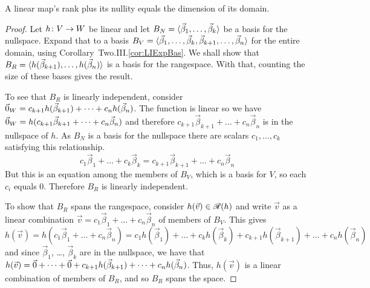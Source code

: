 \begin{theorem}
\label{th:RankPlusNullEqDim}
A linear map's rank plus its nullity equals the dimension of its domain.
\end{theorem}

\begin{proof}
Let \( \mbox{$h\colon V\to W$} \) be linear and
let \( B_N=\langle\vec{\beta}_1,\ldots,\vec{\beta}_k\rangle \)
be a basis for the nullspace.
Expand that to a basis
\( B_V=\langle\vec{\beta}_1,\dots,\vec{\beta}_k,
       \vec{\beta}_{k+1},\dots,\vec{\beta}_n\rangle \)
for the entire domain, using Corollary~Two.III.\ref{cor:LIExpBas}.
We shall show that
\( B_R=\langle h(\vec{\beta}_{k+1}),\dots,h(\vec{\beta}_n)\rangle \)
is a basis for the rangespace.
With that, counting the size of these bases gives the result.

To see that \( B_R \) is linearly independent, 
consider 
\( \vec{0}_W=c_{k+1}h(\vec{\beta}_{k+1})+\dots+c_nh(\vec{\beta}_n) \).
The function is linear so we have
\( \vec{0}_W=h(c_{k+1}\vec{\beta}_{k+1}+\dots+c_n\vec{\beta}_n) \)
and therefore \( c_{k+1}\vec{\beta}_{k+1}+\dots+c_n\vec{\beta}_n \)
is in the nullspace of $h$.
As \( B_N\) is a basis for the nullspace there are scalars
\( c_1,\dots,c_k \) satisfying this relationship.
\begin{equation*}
   c_1\vec{\beta}_1+\dots+c_k\vec{\beta}_k
   =
   c_{k+1}\vec{\beta}_{k+1}+\dots+c_n\vec{\beta}_n
\end{equation*}
But this is an equation among the members of \( B_V \), 
which is a basis for \( V \), so each $c_i$ equals $0$.
Therefore \( B_R \) is linearly independent.

To show that \( B_R \) spans the rangespace,
consider \( h(\vec{v})\in \mathscr{R}(h) \) and
write \( \vec{v} \) as a linear combination 
$\vec{v}=c_1\vec{\beta}_1+\dots+c_n\vec{\beta}_n$
of members of \( B_V \).
This gives
$h(\vec{v})=h(c_1\vec{\beta}_1+\dots+c_n\vec{\beta}_n)
     =c_1h(\vec{\beta}_1)+\dots+c_kh(\vec{\beta}_k)
     +c_{k+1}h(\vec{\beta}_{k+1})+\dots+c_nh(\vec{\beta}_n)$
and since 
$\vec{\beta}_1$, \ldots, $\vec{\beta}_k$ are in the nullspace, we have
that 
$h(\vec{v})=\vec{0}+\dots+\vec{0}
     +c_{k+1}h(\vec{\beta}_{k+1})+\dots+c_nh(\vec{\beta}_n)$.
Thus, $h(\vec{v})$ is a linear combination of members of \( B_R \),
and so $B_R$ spans the space.
\end{proof}

